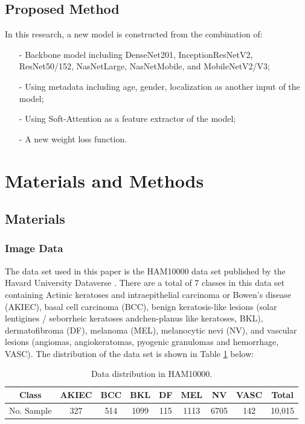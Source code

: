 \documentclass[sensors,article,accept,pdftex,moreauthors]{Definitions/mdpi}
\begin{document}
	\subsection{Proposed Method}
	In this research, a new model is constructed from the combination of:
	
	\begin{itemize}
	\item[-] Backbone model including DenseNet201, InceptionResNetV2, ResNet50/152, NasNetLarge, NasNetMobile, and MobileNetV2/V3;
	\item[-] Using metadata including age, gender, localization as another input of the model;
	\item[-] Using Soft-Attention as a feature extractor of the model;
	\item[-] A new weight loss function.
	\end{itemize}
	\section{Materials and Methods}
	\subsection{Materials}
	\subsubsection{Image Data}
	The data set used in this paper is the HAM10000 data set published by the Havard University Dataverse \cite{10417}. There are a total of 7 classes in this data set containing Actinic keratoses and intraepithelial carcinoma or Bowen's disease (AKIEC), basal cell carcinoma (BCC),  benign keratosis-like lesions (solar lentigines / seborrheic keratoses andchen-planus like keratoses, BKL), dermatofibroma (DF), melanoma (MEL), melanocytic nevi (NV), and vascular lesions (angiomas, angiokeratomas, pyogenic granulomas and hemorrhage, VASC). The distribution of the data set is shown in Table \ref{table:data-distribution} below:
	
	\begin{table}[H]
		\caption{Data distribution in HAM10000.}
		\label{table:data-distribution}
		\setlength{\tabcolsep}{3.05mm}\begin{tabular}{c c c c c c c c c} 
\toprule
\textbf{Class} & \textbf{AKIEC} & \textbf{BCC} & \textbf{BKL} & \textbf{DF} & \textbf{MEL} & \textbf{NV} & \textbf{VASC} & \textbf{Total} \\ 
\midrule
No. Sample & 327 & 514 & 1099 & 115 & 1113 & 6705 & 142 & 10,015 \\
\bottomrule
		\end{tabular}
	\end{table}
	
\end{document}

